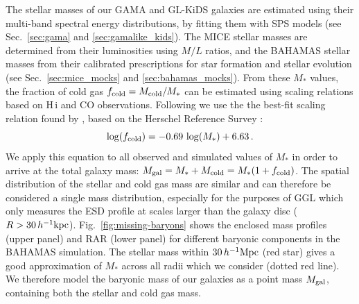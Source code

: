 \documentclass[usenatbib]{mnras}
\newcommand{\hkpc}{\, h^{-1}{\rm{kpc}} }
\newcommand{\hMpc}{\, h^{-1}{\rm{Mpc}} }
\newcommand{\un}[1]{_{\rm #1}}
\begin{document}
The stellar masses of our GAMA and GL-KiDS galaxies are estimated using their multi-band spectral energy distributions, by fitting them with SPS models (see Sec.~\ref{sec:gama} and \ref{sec:gamalike_kids}). The MICE stellar masses are determined from their luminosities using \cite{bell2001} $M/L$ ratios, and the BAHAMAS stellar masses from their calibrated prescriptions for star formation and stellar evolution (see Sec.~\ref{sec:mice_mocks} and \ref{sec:bahamas_mocks}). From these $M_*$ values, the fraction of cold gas $f\un{cold} = M\un{cold}/M_*$ can be estimated using scaling relations based on H\,{\sc i} and CO observations. Following \cite{brouwer2017} we use the the best-fit scaling relation found by \cite{boselli2014}, based on the  Herschel Reference Survey \cite[]{boselli2010}:
\begin{equation}\label{eq:fcold}
	\log(f\un{cold}) = -0.69 \, \log(M_*) + 6.63 \, .
\end{equation}
We apply this equation to all observed and simulated values of $M_*$ in order to arrive at the total galaxy mass: $M\un{gal} = M_* + M\un{cold} = M_* (1 + f\un{cold})$. The spatial distribution of the stellar and cold gas mass are similar \cite[]{pohlen2010,crocker2011,cooper2012,davis2013} and can therefore be considered a single mass distribution, especially for the purposes of GGL which only measures the ESD profile at scales larger than the galaxy disc ($R>30\hkpc$). Fig.~\ref{fig:missing-baryons} shows the enclosed mass profiles (upper panel) and RAR (lower panel) for different baryonic components in the BAHAMAS simulation. The stellar mass within $30 \hMpc$ (red star) gives a good approximation of $M_*$ across all radii which we consider (dotted red line). We therefore model the baryonic mass of our galaxies as a point mass $M\un{gal}$, containing both the stellar and cold gas mass.
\end{document}
